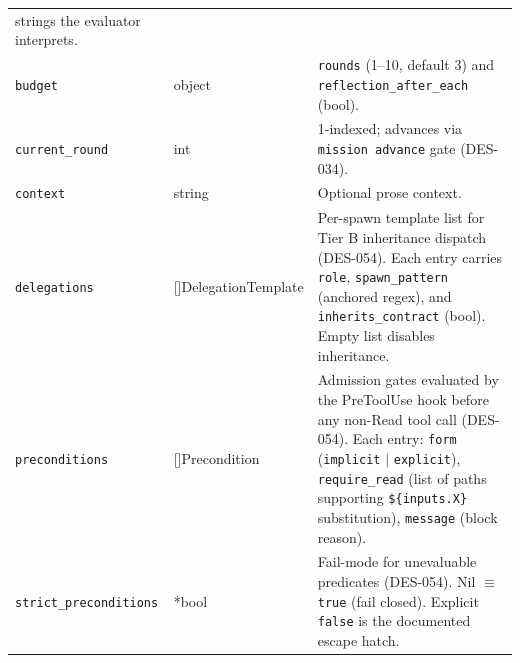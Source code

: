 \documentclass[a4paper,10pt]{article}
\newcommand{\field}[1]{\texttt{#1}}
\newcommand{\cmd}[1]{\texttt{#1}}
\begin{document}
\begin{center}
\begin{longtable}{@{}llp{7cm}@{}}
                                          strings the evaluator
                                          interprets. \\
\field{budget}         & object         & \field{rounds} (1--10,
                                          default 3) and
                                          \field{reflection\_after\_each}
                                          (bool). \\
\field{current\_round} & int            & 1-indexed; advances via
                                          \cmd{mission advance}
                                          gate (DES-034). \\
\field{context}        & string         & Optional prose context. \\
\field{delegations}    & []DelegationTemplate & Per-spawn template
                                          list for Tier B
                                          inheritance dispatch
                                          (DES-054).  Each entry
                                          carries \field{role},
                                          \field{spawn\_pattern}
                                          (anchored regex), and
                                          \field{inherits\_contract}
                                          (bool).  Empty list
                                          disables inheritance. \\
\field{preconditions}  & []Precondition & Admission gates evaluated
                                          by the PreToolUse hook
                                          before any non-Read tool
                                          call (DES-054).  Each
                                          entry: \field{form}
                                          (\texttt{implicit} $|$
                                          \texttt{explicit}),
                                          \field{require\_read}
                                          (list of paths supporting
                                          \texttt{\$\{inputs.X\}}
                                          substitution),
                                          \field{message} (block
                                          reason). \\
\field{strict\_preconditions} & *bool   & Fail-mode for
                                          unevaluable predicates
                                          (DES-054).  Nil $\equiv$
                                          \texttt{true} (fail
                                          closed).  Explicit
                                          \texttt{false} is the
                                          documented escape hatch. \\
\bottomrule
\end{longtable}
\end{center}
\end{document}

